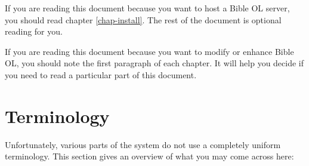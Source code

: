 \documentclass[11pt,oneside,a4paper]{memoir}
\begin{document}
If you are reading this document because you want to host a Bible OL server, you should read chapter
\ref{chap-install}. The rest of the document is optional reading for you.

If you are reading this document because you want to modify or enhance Bible OL, you should note
the first paragraph of each chapter. It will help you decide if you need to read a
particular part of this document.




\section{Terminology}\label{sec-terminology}

Unfortunately, various parts of the system do not use a completely uniform terminology. This section
gives an overview of what you may come across here:
\end{document}
